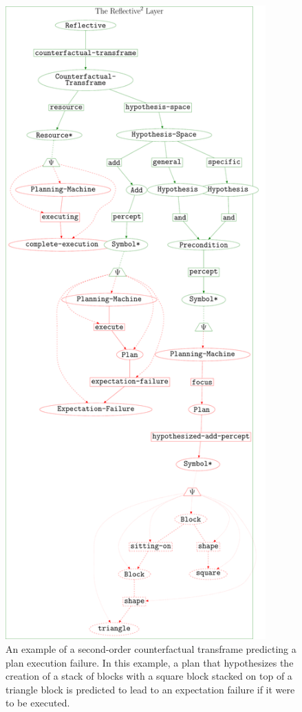 \begin{figure}
\includegraphics[width=10cm]{gfx/example_critical_failure_heuristic}
\caption[An example of a second-order counterfactual transframe
  predicting a plan execution failure.]{An example of a second-order
  counterfactual transframe predicting a plan execution failure.  In
  this example, a plan that hypothesizes the creation of a stack of
  blocks with a square block stacked on top of a triangle block is
  predicted to lead to an expectation failure if it were to be
  executed.}
\label{figure:example_critical_failure_heuristic}
\end{figure}


